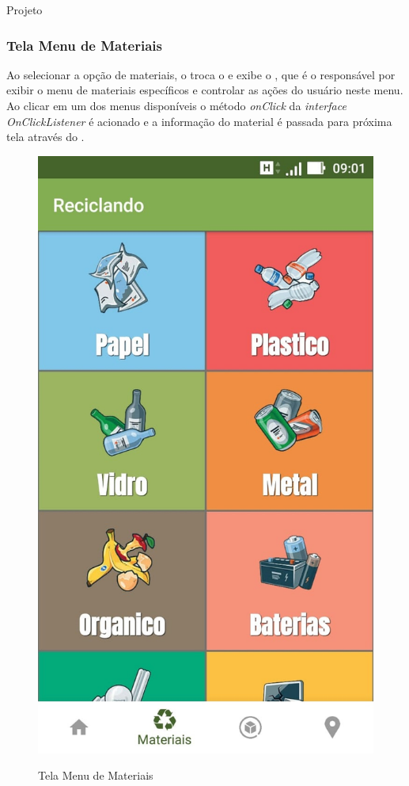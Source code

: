 \documentclass[
	12pt,				%
	openany,			%
	twoside,			%
	a4paper,			%
	english,			%
	french,				%
	spanish,			%
	brazil				%
	]{abntex2}
\begin{document}
\begin{chapter}{Projeto}
\subsubsection{Tela Menu de Materiais} \label{FragmentMaterialMenu}
Ao selecionar a opção de materiais, o  troca o  e exibe o , que é o  responsável por exibir o menu de materiais específicos e controlar as ações do usuário neste menu. Ao clicar em um dos menus disponíveis o método \textit{onClick} da \textit{interface} \textit{OnClickListener} é acionado e a informação do material é passada para próxima tela através do .
\
    \begin{figure}[htb]    
 \centering
  \begin{minipage}{0.45\textwidth}
    \centering
    \caption{Tela Menu de Materiais}
    \includegraphics[scale=0.45]{media/tela_menu_material_1.jpg}
    \legend{Fonte: Autor}
     \label{fig:tela_menu_material_1}
  \end{minipage}
  \hfill
\end{figure}


\end{chapter}
\end{document}
